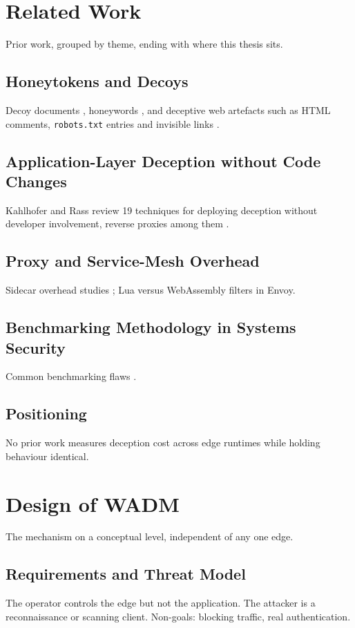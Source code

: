 \documentclass{rptuma}
\begin{document}
\chapter{Related Work}
\label{chap:AB.related}
Prior work, grouped by theme, ending with where this thesis sits.

\section{Honeytokens and Decoys}
Decoy documents \cite{bowen2009baiting}, honeywords \cite{juels2013honeywords}, and deceptive web
artefacts such as HTML comments, \texttt{robots.txt} entries and invisible links
\cite{virvilis2014changing}.

\section{Application-Layer Deception without Code Changes}
Kahlhofer and Rass review 19 techniques for deploying deception without developer involvement,
reverse proxies among them \cite{kahlhofer2024application}.

\section{Proxy and Service-Mesh Overhead}
Sidecar overhead studies \cite{zhu2022dissecting}; Lua versus WebAssembly filters in Envoy.

\section{Benchmarking Methodology in Systems Security}
Common benchmarking flaws \cite{vanderkouwe2019sok,heiser_crimes}.

\section{Positioning}
No prior work measures deception cost across edge runtimes while holding behaviour identical.

\chapter{Design of WADM}
The mechanism on a conceptual level, independent of any one edge.

\section{Requirements and Threat Model}
The operator controls the edge but not the application. The attacker is a reconnaissance or
scanning client. Non-goals: blocking traffic, real authentication.
\end{document}

